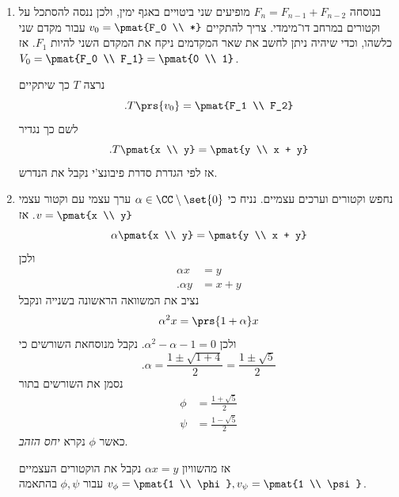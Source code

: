 \documentclass[a4paper,10pt,twoside,openany]{book}
\begin{document}
\begin{solution}
\begin{enumerate}
\item בנוסחה
$F_n = F_{n-1} + F_{n-2}$
מופיעים שני ביטויים באגף ימין, ולכן ננסה להסתכל על וקטורים במרחב דו־מימדי.
צריך להתקיים
$v_0 = \pmat{F_0 \\ *}$
עבור מקדם שני כלשהו, וכדי שיהיה ניתן לחשב את שאר המקדמים ניקח את המקדם השני להיות
$F_1$.
אז
$V_0 = \pmat{F_0 \\ F_1} = \pmat{0 \\ 1}$.

נרצה
$T$
כך שיתקיים
\[\text{.} T\prs{v_0} = \pmat{F_1 \\ F_2}\]
לשם כך נגדיר
\[\text{.} T\pmat{x \\ y} = \pmat{y \\ x + y}\]
אז לפי הגדרת סדרת פיבונצ'י נקבל את הנדרש.

\item נחפש וקטורים וערכים עצמיים. נניח כי
$\alpha \in \CC \setminus \set{0}$
ערך עצמי עם וקטור עצמי
$v = \pmat{x \\ y}$.
אז
\[\alpha \pmat{x \\ y} = \pmat{y \\ x + y}\]
ולכן
\begin{align*}
\alpha x &= y \\
\text{.} \alpha y &= x + y
\end{align*}
נציב את המשוואה הראשונה בשנייה ונקבל
\begin{align*}
\alpha^2 x = \prs{1 + \alpha} x
\end{align*}
ולכן
$\alpha^2 - \alpha - 1 = 0$.
נקבל מנוסחאת השורשים כי
\[\text{.} \alpha = \frac{1 \pm \sqrt{1 + 4}}{2} = \frac{1 \pm \sqrt{5}}{2}\]
נסמן את השורשים בתור
\begin{align*}
\phi &= \frac{1 + \sqrt{5}}{2} \\
\psi &= \frac{1 - \sqrt{5}}{2}
\end{align*}
כאשר $\phi$ נקרא
\emph{יחס הזהב}.

אז מהשוויון
$\alpha x = y$
נקבל את הוקטורים העצמיים
$v_\phi = \pmat{1 \\ \phi},
v_\psi = \pmat{1 \\ \psi}$
עבור
$\phi, \psi$
בהתאמה.


\end{enumerate}
\end{solution}
\end{document}
